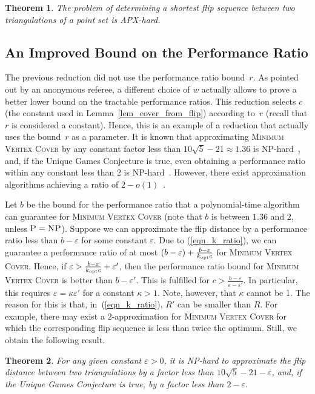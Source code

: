 \documentclass[11pt,a4paper]{article}
\newtheorem{theorem}{Theorem}
\begin{document}
\begin{theorem}
The problem of determining a shortest flip sequence between two triangulations of a point set is APX-hard.
\end{theorem}

\subsection{An Improved Bound on the Performance Ratio}
\label{sec_improved_bound}
The previous reduction did not use the performance ratio bound~$r$.
As pointed out by an anonymous referee, a different choice of $w$ actually allows to prove a better lower bound on the tractable performance ratios.
This reduction selects $c$ (the constant used in Lemma~\ref{lem_cover_from_flip}) according to~$r$ (recall that $r$ is considered a constant).
Hence, this is an example of a reduction that actually uses the bound~$r$ as a parameter.
It is known that approximating \textsc{Minimum Vertex Cover} by any constant factor less than $10\sqrt{5} - 21 \approx 1.36$ is NP-hard~\cite{dinur}, and, if the Unique Games Conjecture is true, even obtaining a performance ratio within any constant less than 2 is NP-hard~\cite{khot}.
However, there exist approximation algorithms achieving a ratio of $2 - o(1)$~\cite{hochbaum,karakostas}.

Let $b$ be the bound for the performance ratio that a polynomial-time algorithm can guarantee for \textsc{Minimum Vertex Cover} (note that $b$ is between $1.36$ and $2$, unless $\textsc{P}=\textsc{NP}$).
Suppose we can approximate the flip distance by a performance ratio less than $b - \varepsilon$ for some constant $\varepsilon$.
Due to (\ref{eqn_k_ratio}), we can guarantee a performance ratio of at most $(b-\varepsilon) + \frac{b-\varepsilon}{k_{\mathrm{opt}} c}$ for \textsc{Minimum Vertex Cover}.
Hence, if $\varepsilon > \frac{b-\varepsilon}{k_{\mathrm{opt}} c} + \varepsilon'$, then the performance ratio bound for \textsc{Minimum Vertex Cover} is better than $b-\varepsilon'$.
This is fulfilled for $c > \frac{b-\varepsilon}{\varepsilon - \varepsilon'}$.
In particular, this requires $\varepsilon = \kappa \varepsilon'$ for a constant $\kappa > 1$.
Note, however, that $\kappa$ cannot be 1.
The reason for this is that, in~(\ref{eqn_k_ratio}), $R'$ can be smaller than $R$.
For example, there may exist a 2-approximation for \textsc{Minimum Vertex Cover} for which the corresponding flip sequence is less than twice the optimum.
Still, we obtain the following result.

\begin{theorem}
For any given constant $\varepsilon > 0$, it is NP-hard to approximate the flip distance between two triangulations by a factor less than $10\sqrt{5} - 21 - \varepsilon$, and, if the Unique Games Conjecture is true, by a factor less than $2 - \varepsilon$.
\end{theorem}
\end{document}
